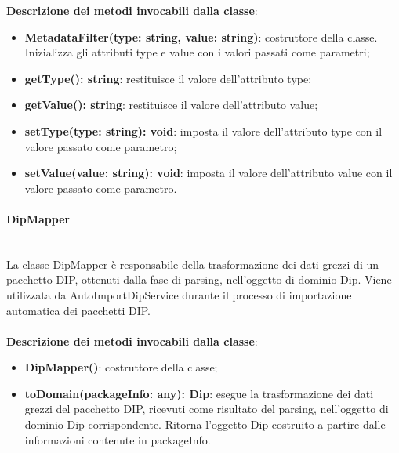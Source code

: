 \documentclass[a4paper,12pt]{article}
\begin{document}
{{{              \noindent \textbf{Descrizione dei metodi invocabili dalla classe}:
                \begin{itemize}
                    \item \textbf{MetadataFilter(type: string, value: string)}: costruttore della classe. Inizializza gli attributi type e value con i valori passati come parametri;
                    \item \textbf{getType(): string}: restituisce il valore dell'attributo type;
                    \item \textbf{getValue(): string}: restituisce il valore dell'attributo value;
                    \item \textbf{setType(type: string): void}: imposta il valore dell'attributo type con il valore passato come parametro;
                    \item \textbf{setValue(value: string): void}: imposta il valore dell'attributo value con il valore passato come parametro.
                \end{itemize}
                \paragraph{DipMapper}\label{par:DipMapper}\mbox{}\\
                La classe DipMapper è responsabile della trasformazione dei dati grezzi di un pacchetto DIP, ottenuti dalla fase di parsing, nell'oggetto di dominio Dip. Viene utilizzata da AutoImportDipService durante il processo di importazione automatica dei pacchetti DIP.\\
                \\
               \noindent \textbf{Descrizione dei metodi invocabili dalla classe}:
                \begin{itemize}
                    \item \textbf{DipMapper()}: costruttore della classe;
                    \item \textbf{toDomain(packageInfo: any): Dip}: esegue la trasformazione dei dati grezzi del pacchetto DIP, ricevuti come risultato del parsing, nell'oggetto di dominio Dip corrispondente. Ritorna l'oggetto Dip costruito a partire dalle informazioni contenute in packageInfo.
                \end{itemize}
}}}
\end{document}
